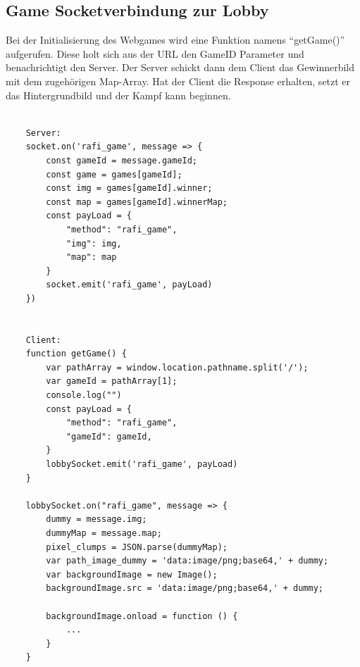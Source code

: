 \subsection{Game Socketverbindung zur Lobby}
Bei der Initialisierung des Webgames wird eine Funktion namens ``getGame()'' aufgerufen. Diese holt sich aus der URL den GameID Parameter und benachrichtigt den Server. 
Der Server schickt dann dem Client das Gewinnerbild mit dem zugehörigen Map-Array. 
Hat der Client die Response erhalten, setzt er das Hintergrundbild und der Kampf kann beginnen.
\begin{lstlisting}[language=html,caption=Webgame Socket]
    
    Server:
    socket.on('rafi_game', message => {
        const gameId = message.gameId;
        const game = games[gameId];
        const img = games[gameId].winner;
        const map = games[gameId].winnerMap;
        const payLoad = {
            "method": "rafi_game",
            "img": img,
            "map": map
        }
        socket.emit('rafi_game', payLoad)
    })


    Client:
    function getGame() {
        var pathArray = window.location.pathname.split('/');
        var gameId = pathArray[1];
        console.log("")
        const payLoad = {
            "method": "rafi_game",
            "gameId": gameId,
        }
        lobbySocket.emit('rafi_game', payLoad)
    }

    lobbySocket.on("rafi_game", message => {
        dummy = message.img;
        dummyMap = message.map;
        pixel_clumps = JSON.parse(dummyMap);
        var path_image_dummy = 'data:image/png;base64,' + dummy;
        var backgroundImage = new Image();
        backgroundImage.src = 'data:image/png;base64,' + dummy;
    
        backgroundImage.onload = function () {
            ...
        }
    }
\end{lstlisting}


